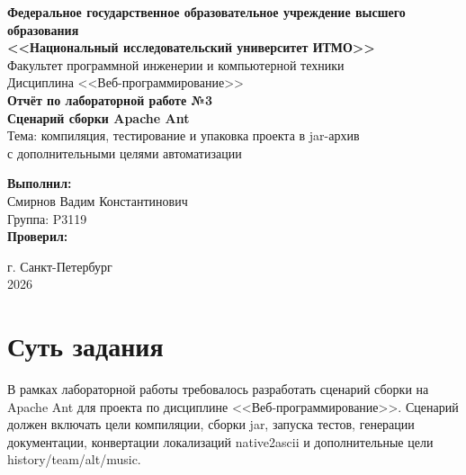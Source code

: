 \documentclass[12pt,a4paper]{article}
\begin{document}
\begin{titlepage}
\begin{center}
\textbf{Федеральное государственное образовательное учреждение высшего образования}\\
\textbf{<<Национальный исследовательский университет ИТМО>>}\\[1.5cm]

Факультет программной инженерии и компьютерной техники\\
Дисциплина <<Веб-программирование>>\\[2.5cm]

\textbf{\Large Отчёт по лабораторной работе №3}\\[0.3cm]
\textbf{\Large Сценарий сборки Apache Ant}\\[0.8cm]
\normalsize
Тема: компиляция, тестирование и упаковка проекта в jar-архив\\
с дополнительными целями автоматизации
\end{center}

\vfill

\begin{flushright}
\textbf{Выполнил:}\\
Смирнов Вадим Константинович\\
Группа: P3119\\[0.7cm]

\textbf{Проверил:}\\
\underline{\hspace{6cm}}
\end{flushright}

\vfill

\begin{center}
г. Санкт-Петербург\\
2026
\end{center}
\end{titlepage}

\tableofcontents
\newpage

\section{Суть задания}
В рамках лабораторной работы требовалось разработать сценарий сборки на Apache Ant
для проекта по дисциплине <<Веб-программирование>>.
Сценарий должен включать цели компиляции, сборки jar, запуска тестов, генерации документации,
конвертации локализаций native2ascii и дополнительные цели history/team/alt/music.
\end{document}
